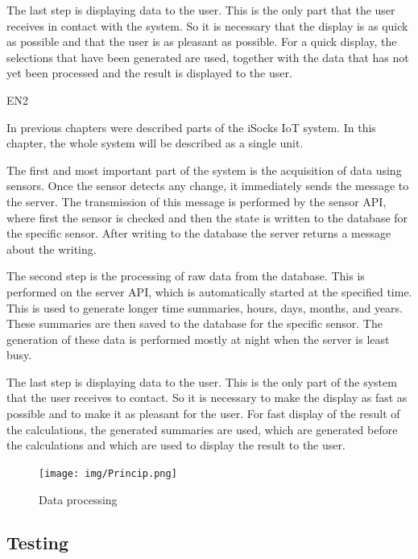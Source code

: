 \documentclass[12pt, a4paper]{article}
\begin{document}
The last step is displaying data to the user.
This is the only part that the user receives in contact with the system.
So it is necessary that the display is as quick as possible and that the user is as pleasant as possible.
For a quick display, the selections that have been generated are used, together with the data that has not yet been processed and the result is displayed to the user.

EN2

In previous chapters were described parts of the iSocks IoT system.
In this chapter, the whole system will be described as a single unit.

The first and most important part of the system is the acquisition of data using sensors.
Once the sensor detects any change, it immediately sends the message to the server.
The transmission of this message is performed by the sensor API, where first the sensor is checked and then the state is written to the database for the specific sensor.
After writing to the database the server returns a message about the writing.

The second step is the processing of raw data from the database.
This is performed on the server API, which is automatically started at the specified time.
This is used to generate longer time summaries, hours, days, months, and years.
These summaries are then saved to the database for the specific sensor.
The generation of these data is performed mostly at night when the server is least busy.

The last step is displaying data to the user.
This is the only part of the system that the user receives to contact.
So it is necessary to make the display as fast as possible and to make it as pleasant for the user.
For fast display of the result of the calculations, the generated summaries are used, which are generated before the calculations and which are used to display the result to the user.



\begin{figure}[t]
    \centering
    \texttt{[image: img/Princip.png]}
    \caption{Data processing}
    \label{fig:princip}
\end{figure}


\subsection*{Testing}
\end{document}

